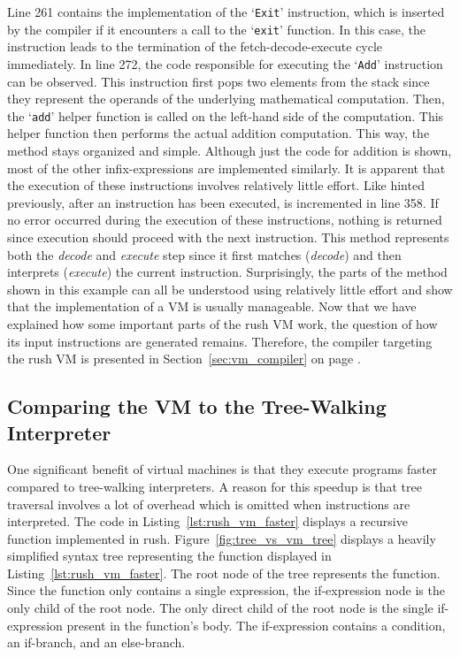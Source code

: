 Line 261 contains the implementation of the `\texttt{Exit}' instruction, which is inserted by the compiler if it encounters a call to the `\texttt{exit}' function.
In this case, the instruction leads to the termination of the fetch-decode-execute cycle immediately.
In line 272, the code responsible for executing the `\texttt{Add}' instruction can be observed.
This instruction first pops two elements from the stack since they represent the operands of the underlying mathematical computation.
Then, the `\texttt{add}' helper function is called on the left-hand side of the computation.
This helper function then performs the actual addition computation.
This way, the  method stays organized and simple.
Although just the code for addition is shown, most of the other infix-expressions are implemented similarly.
It is apparent that the execution of these instructions involves relatively little effort.
Like hinted previously, after an instruction has been executed,  is incremented in line 358.
If no error occurred during the execution of these instructions, nothing is returned since execution should proceed with the next instruction.
This method represents both the \emph{decode} and \emph{execute} step since it first matches (\emph{decode}) and then interprets (\emph{execute}) the current instruction.
Surprisingly, the parts of the method shown in this example can all be understood using relatively little effort and show that the implementation of a VM is usually manageable.
Now that we have explained how some important parts of the rush VM work, the question of how its input instructions are generated remains.
Therefore, the compiler targeting the rush VM is presented in Section~\ref{sec:vm_compiler} on page \pageref{sec:vm_compiler}.

\subsection{Comparing the VM to the Tree-Walking Interpreter}

One significant benefit of virtual machines is that they execute programs faster compared to tree-walking interpreters.
A reason for this speedup is that tree traversal involves a lot of overhead which is omitted when instructions are interpreted.
The code in Listing~\ref{lst:rush_vm_faster} displays a recursive function implemented in rush.
Figure~\ref{fig:tree_vs_vm_tree} displays a heavily simplified syntax tree representing the function displayed in Listing~\ref{lst:rush_vm_faster}.
The root node of the tree represents the  function.
Since the function only contains a single expression, the if-expression node is the only child of the root node.
The only direct child of the root node is the single if-expression present in the function's body.
The if-expression contains a condition, an if-branch, and an else-branch.


